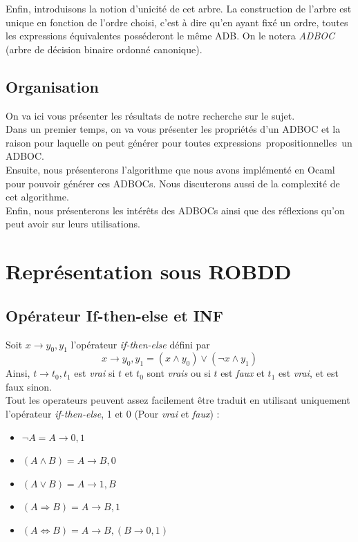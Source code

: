 \documentclass[a4paper, oneside]{report}
\newcommand{\expps}{expressions~propositionnelles~}
\begin{document}
Enfin, introduisons la notion d'unicité de cet arbre. La construction de l'arbre est unique en fonction de l'ordre choisi, c'est à dire qu'en ayant fixé un ordre, toutes les expressions équivalentes posséderont le même ADB. On le notera \textit{ADBOC} (arbre de décision binaire ordonné canonique).\\
 
\section*{Organisation}
On va ici vous présenter les résultats de notre recherche sur le sujet.\\
Dans un premier temps, on va vous présenter les propriétés d'un ADBOC et la raison pour laquelle on peut générer pour toutes \expps un ADBOC.\\
Ensuite, nous présenterons l'algorithme que nous avons implémenté en Ocaml pour pouvoir générer ces ADBOCs. Nous discuterons aussi de la complexité de cet algorithme.\\
Enfin, nous présenterons les intérêts des ADBOCs ainsi que des réflexions qu'on peut avoir sur leurs utilisations.  



\chapter{Représentation sous ROBDD}

\section{Opérateur If-then-else et INF}

Soit $ x \rightarrow y_0, y_1 $ l'opérateur \textit{if-then-else} défini par \\
$$ x \rightarrow y_0, y_1 = ( x \wedge y_0 ) \vee ( \neg x \wedge y_1 )$$
Ainsi, $ t \rightarrow t_0, t_1 $ est \textit{vrai} si $t$ et $t_0$ sont \textit{vrais} ou si $t$ est \textit{faux} et $t_1$ est \textit{vrai}, et est faux sinon.\\
Tout les operateurs peuvent assez facilement être traduit en utilisant uniquement l'opérateur \textit{if-then-else}, 1 et 0 (Pour \textit{vrai} et \textit{faux}) :\\

\begin{itemize}
\item $ \neg A = A \rightarrow 0, 1$
\item $ (A \wedge B) = A \rightarrow B, 0$
\item $ (A \vee B) = A \rightarrow 1, B$
\item $ (A \Rightarrow B) = A \rightarrow B, 1$
\item $ (A \Leftrightarrow B) = A \rightarrow B, (B \rightarrow 0, 1)$
\end{itemize}
\end{document}
